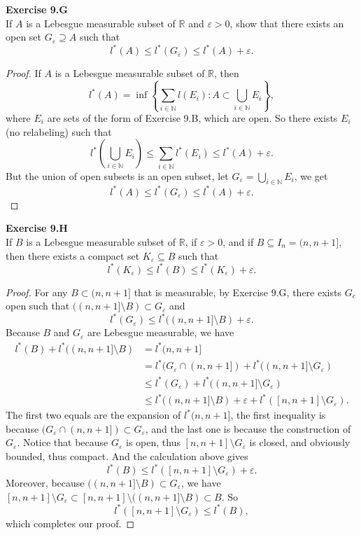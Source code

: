 \documentclass[12pt, a4paper]{article}
\theoremstyle{plain}
\newcommand{\N}{\mathbb{N}}
\newcommand{\R}{\mathbb{R}}
\def\epsilon{\varepsilon}
\newenvironment{exercise}[2][Exercise]
    { \begin{mdframed}[backgroundcolor=gray!20] \textbf{#1 #2} \\}
    {  \end{mdframed}}
\begin{document}
\begin{exercise}{9.G}
    If $A$ is a Lebesgue measurable subset of $\R$ and $\epsilon>0$, show that there exists an open set $G_\epsilon\supseteq A$ such that
    \[
    l^*(A)\leq l^*(G_\epsilon)\leq l^*(A)+\epsilon.
    \]
\end{exercise}
    \begin{proof}
        If $A$ is a Lebesgue measurable subset of $\R$, then 
        \[
        l^*(A) = \inf\left\{\sum_{i\in\N}l(E_i):A\subset \bigcup_{i\in\N} E_i\right\},
        \]
        where $E_i$ are sets of the form of Exercise 9.B, which are open. So there exists $E_i$ (no relabeling) such that
        \[
        l^*\left(\bigcup_{i\in\N} E_i\right)\leq \sum_{i\in\N}l^*(E_i) \leq l^*(A)+\epsilon.
        \]
        But the union of open subsets is an open subset, let $G_\epsilon = \bigcup_{i\in\N}E_i$, we get
        \[
        l^*(A)\leq l^*(G_\epsilon)\leq l^*(A)+\epsilon.
        \]
    \end{proof}

\pagebreak

\begin{exercise}{9.H}
    If $B$ is a Lebesgue measurable subset of $\R$, if $\epsilon>0$, and if $B\subseteq I_n=(n,n+1]$, then there exists a compact set $K_\epsilon\subseteq B$ such that 
    \[
    l^*(K_\epsilon)\leq l^*(B)\leq l^*(K_\epsilon)+\epsilon.
    \]
\end{exercise}
    \begin{proof}
        For any $B\subset (n,n+1]$ that is measurable, by Exercise 9.G, there exists $G_e$ open such that $((n,n+1]\setminus B)\subset G_\epsilon$ and
        \[
        l^*(G_\epsilon)\leq l^*((n,n+1]\setminus B)+\epsilon.
        \]
        Because $B$ and $G_\epsilon$ are Lebesgue measurable, we have
        \begin{align*}
        l^*(B)+l^*((n,n+1]\setminus B) &= l^*(n,n+1]\\
        &= l^*(G_\epsilon\cap(n,n+1])+l^*((n,n+1]\setminus G_\epsilon)\\
        &\leq l^*(G_\epsilon) + l^*((n,n+1]\setminus G_\epsilon)\\
        &\leq l^*((n,n+1]\setminus B)+\epsilon +l^*([n,n+1]\setminus G_\epsilon).
        \end{align*}
        The first two equals are the expansion of $l^*(n,n+1]$, the first inequality is because $(G_\epsilon\cap (n,n+1])\subset G_\epsilon$, and the last one is because the construction of $G_\epsilon$. Notice that because $G_\epsilon$ is open, thus $[n,n+1]\setminus G_\epsilon$ is closed, and obviously bounded, thus compact. And the calculation above gives
        \[
        l^*(B)\leq l^*([n,n+1]\setminus G_\epsilon)+\epsilon.
        \]
        Moreover, because $((n,n+1]\setminus B)\subset G_\epsilon$, we have $[n,n+1]\setminus G_\epsilon \subset [n,n+1]\setminus((n,n+1]\setminus B)\subset B$. So
        \[
        l^*([n,n+1]\setminus G_\epsilon)\leq l^*(B),
        \]
        which completes our proof.
    \end{proof}
\end{document}
